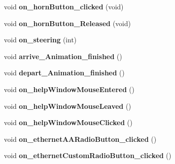 \begin{DoxyCompactItemize}
\item 
\hypertarget{class_main_window_abe4b8da14328af4d591d714685f19164}{}void {\bfseries on\+\_\+horn\+Button\+\_\+clicked} (void)\label{class_main_window_abe4b8da14328af4d591d714685f19164}

\item 
\hypertarget{class_main_window_aa42039e574e036e640ab9e20ab08e7a2}{}void {\bfseries on\+\_\+horn\+Button\+\_\+\+Released} (void)\label{class_main_window_aa42039e574e036e640ab9e20ab08e7a2}

\item 
\hypertarget{class_main_window_a0a589c017e8858f2856ecf198f2762e1}{}void {\bfseries on\+\_\+steering} (int)\label{class_main_window_a0a589c017e8858f2856ecf198f2762e1}

\item 
\hypertarget{class_main_window_a693c95d5a5393f1d49497e82502c4ead}{}void {\bfseries arrive\+\_\+\+Animation\+\_\+finished} ()\label{class_main_window_a693c95d5a5393f1d49497e82502c4ead}

\item 
\hypertarget{class_main_window_aa17d087c9affe02c39bd9b71f1bddf0e}{}void {\bfseries depart\+\_\+\+Animation\+\_\+finished} ()\label{class_main_window_aa17d087c9affe02c39bd9b71f1bddf0e}

\item 
\hypertarget{class_main_window_af17fda29d8ac7e4afe9b311b716e12ce}{}void {\bfseries on\+\_\+help\+Window\+Mouse\+Entered} ()\label{class_main_window_af17fda29d8ac7e4afe9b311b716e12ce}

\item 
\hypertarget{class_main_window_a3157573a5834a4e1bd4ab73f9a1376b7}{}void {\bfseries on\+\_\+help\+Window\+Mouse\+Leaved} ()\label{class_main_window_a3157573a5834a4e1bd4ab73f9a1376b7}

\item 
\hypertarget{class_main_window_ae009b2d1ec85c5f757b179ae6ee2e0cb}{}void {\bfseries on\+\_\+help\+Window\+Mouse\+Clicked} ()\label{class_main_window_ae009b2d1ec85c5f757b179ae6ee2e0cb}

\item 
\hypertarget{class_main_window_a108aeb29eb7f25a6e578428f39fc2d9b}{}void {\bfseries on\+\_\+ethernet\+A\+A\+Radio\+Button\+\_\+clicked} ()\label{class_main_window_a108aeb29eb7f25a6e578428f39fc2d9b}

\item 
\hypertarget{class_main_window_ab05ccc37a4f37cb0078ae583055006b2}{}void {\bfseries on\+\_\+ethernet\+Custom\+Radio\+Button\+\_\+clicked} ()\label{class_main_window_ab05ccc37a4f37cb0078ae583055006b2}


\end{DoxyCompactItemize}
